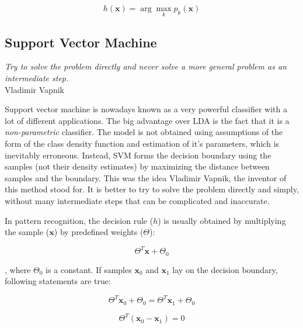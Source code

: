 \documentclass{article}
\newcommand{\argmax}{\arg\!\max} %
\begin{document}
\begin{equation} 
h(\mathbf{x}) = \argmax_k p_k(\mathbf{x})
\end{equation}


\subsection{Support Vector Machine}

\begin{myquote}
\begin{flushright}
\textit{Try to solve the problem directly and never solve a more general problem as an intermediate step.} \\Vladimir Vapnik
\end{flushright}
\end{myquote}


Support vector machine is nowadays known as a very powerful classifier with a lot of different applications. The big advantage over LDA is the fact that it is a \emph{non-parametric} classifier. The model is not obtained using assumptions of the form of the class density function and estimation of it's parameters, which is inevitably erroneous. Instead, SVM forms the decision boundary using the samples (not their density estimates) by maximizing the distance between samples and the boundary.
This was the idea Vladimir Vapnik, the inventor of this method stood for. It is better to try to solve the problem directly and simply, without many intermediate steps that can be complicated and inaccurate.


In pattern recognition, the decision rule ($h$) is usually obtained by multiplying the sample ($\mathbf{x}$) by predefined weights ($\Theta$):

\begin{equation} 
\Theta^T \mathbf{x} + \Theta_0
\end{equation}

\noindent , where $\Theta_0$ is a constant. If samples $\mathbf{x}_0$ and $\mathbf{x}_1$ lay on the decision boundary, following statements are true:

\begin{equation} 
\Theta^T \mathbf{x}_0 + \Theta_0 = \Theta^T \mathbf{x}_1 + \Theta_0
\end{equation}

\begin{equation} 
\Theta^T (\mathbf{x}_0 - \mathbf{x}_1) = 0
\end{equation}
\end{document}
